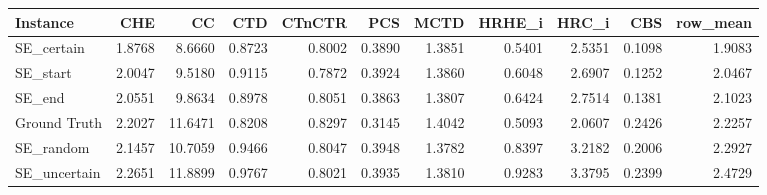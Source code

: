 \begin{tabular}{lrrrrrrrrrr}
\toprule
Instance & CHE & CC & CTD & CTnCTR & PCS & MCTD & HRHE_i & HRC_i & CBS & row_mean \\
\midrule
SE_certain & 1.8768 & 8.6660 & 0.8723 & 0.8002 & 0.3890 & 1.3851 & 0.5401 & 2.5351 & 0.1098 & 1.9083 \\
SE_start & 2.0047 & 9.5180 & 0.9115 & 0.7872 & 0.3924 & 1.3860 & 0.6048 & 2.6907 & 0.1252 & 2.0467 \\
SE_end & 2.0551 & 9.8634 & 0.8978 & 0.8051 & 0.3863 & 1.3807 & 0.6424 & 2.7514 & 0.1381 & 2.1023 \\
Ground Truth & 2.2027 & 11.6471 & 0.8208 & 0.8297 & 0.3145 & 1.4042 & 0.5093 & 2.0607 & 0.2426 & 2.2257 \\
SE_random & 2.1457 & 10.7059 & 0.9466 & 0.8047 & 0.3948 & 1.3782 & 0.8397 & 3.2182 & 0.2006 & 2.2927 \\
SE_uncertain & 2.2651 & 11.8899 & 0.9767 & 0.8021 & 0.3935 & 1.3810 & 0.9283 & 3.3795 & 0.2399 & 2.4729 \\
\bottomrule
\end{tabular}

